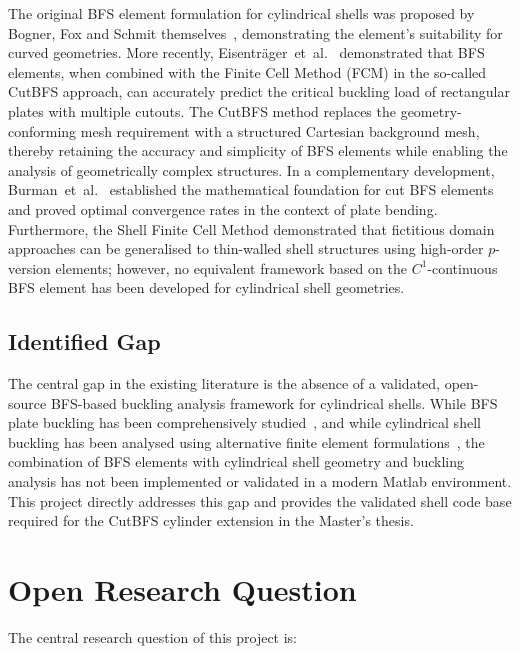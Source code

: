 \documentclass[9pt,a4paper,twoside]{tau-class/tau}
\begin{document}
The original BFS element formulation for cylindrical shells was proposed by
Bogner, Fox and Schmit themselves~\cite{bogner1965}, demonstrating the
element's suitability for curved geometries. More recently,
Eisentr\"{a}ger~et~al.~\cite{eisentraeger2022} demonstrated that BFS
elements, when combined with the Finite Cell Method (FCM) in the so-called
CutBFS approach, can accurately predict the critical buckling load of
rectangular plates with multiple cutouts. The CutBFS method replaces the
geometry-conforming mesh requirement with a structured Cartesian background
mesh, thereby retaining the accuracy and simplicity of BFS elements while
enabling the analysis of geometrically complex structures. In a complementary
development, Burman~et~al.~\cite{burman2020} established the mathematical
foundation for cut BFS elements and proved optimal convergence rates in the
context of plate bending. Furthermore, the Shell Finite Cell Method
\cite{shellFCM2011} demonstrated that fictitious domain approaches can be
generalised to thin-walled shell structures using high-order $p$-version
elements; however, no equivalent framework based on the $C^1$-continuous BFS
element has been developed for cylindrical shell geometries.

\subsection{Identified Gap}

The central gap in the existing literature is the absence of a validated,
open-source BFS-based buckling analysis framework for cylindrical shells.
While BFS plate buckling has been comprehensively studied~\cite{eisentraeger2022},
and while cylindrical shell buckling has been analysed using alternative finite
element formulations~\cite{timoshenko1961,abaqus2009}, the combination of
BFS elements with cylindrical shell geometry and buckling analysis has not
been implemented or validated in a modern Matlab environment. This project
directly addresses this gap and provides the validated shell code base
required for the CutBFS cylinder extension in the Master's thesis.

\section{Open Research Question}

The central research question of this project is:
\end{document}
